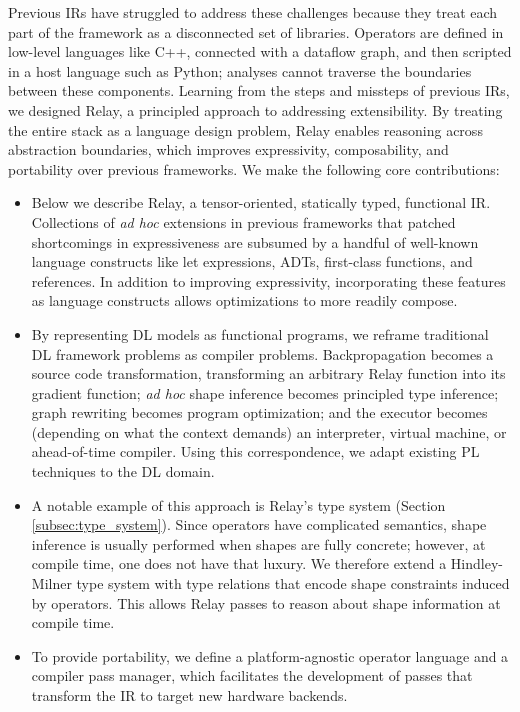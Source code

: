 Previous IRs have struggled to address these challenges because they treat
  each part of the framework as a disconnected set of libraries.
Operators are defined in low-level languages like C++,
  connected with a dataflow graph, and then scripted
  in a host language such as Python;
  analyses cannot traverse the boundaries between these components.
Learning from the steps and missteps of previous IRs, we designed Relay,
  a principled approach to addressing extensibility.
By treating the entire stack as a language
  design problem, Relay enables reasoning across
  abstraction boundaries, which
  improves expressivity, composability, and portability over previous frameworks.
We make the following core contributions:
\begin{itemize}
  \item
  Below we describe Relay, a tensor-oriented, statically typed,
    functional IR.
  Collections of \textit{ad hoc} extensions in previous frameworks
    that patched shortcomings in expressiveness are subsumed by a handful of well-known language
    constructs like let expressions, ADTs, first-class functions, and references.
  In addition to improving expressivity,
    incorporating these features as language constructs
    allows optimizations to more readily compose.
  \item
  By representing DL models as functional programs, we reframe traditional
    DL framework problems as compiler problems.
  Backpropagation becomes a source code transformation,
    transforming an arbitrary Relay function into its gradient function;
    \textit{ad hoc} shape inference becomes principled type inference;
    graph rewriting becomes program optimization;
    and the executor becomes (depending on what the context demands) an
    interpreter, virtual machine, or ahead-of-time compiler.
  Using this correspondence, we adapt existing
    PL techniques to the DL domain.
  \item
    A notable example of this approach is Relay's type system (Section \ref{subsec:type_system}).
    Since operators have complicated semantics, shape inference is usually
      performed when shapes are fully concrete;
      however, at compile time, one does not have that luxury.
    We therefore extend a Hindley-Milner type system with type relations that encode shape
      constraints induced by operators.
    This allows Relay passes to reason about shape information at compile time.
  \item To provide portability,
    we define a platform-agnostic operator language
    and a compiler pass manager, which facilitates the development of
    passes that transform the IR to target new hardware backends.
\end{itemize}

